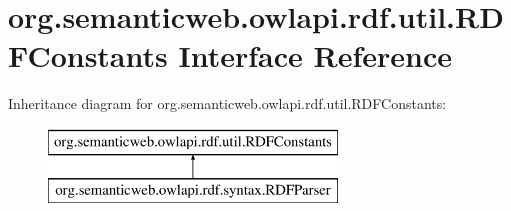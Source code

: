 \hypertarget{interfaceorg_1_1semanticweb_1_1owlapi_1_1rdf_1_1util_1_1_r_d_f_constants}{\section{org.\-semanticweb.\-owlapi.\-rdf.\-util.\-R\-D\-F\-Constants Interface Reference}
\label{interfaceorg_1_1semanticweb_1_1owlapi_1_1rdf_1_1util_1_1_r_d_f_constants}
}
Inheritance diagram for org.\-semanticweb.\-owlapi.\-rdf.\-util.\-R\-D\-F\-Constants\-:\begin{figure}[H]
\begin{center}
\leavevmode
\includegraphics[height=2.000000cm]{interfaceorg_1_1semanticweb_1_1owlapi_1_1rdf_1_1util_1_1_r_d_f_constants}
\end{center}
\end{figure}
